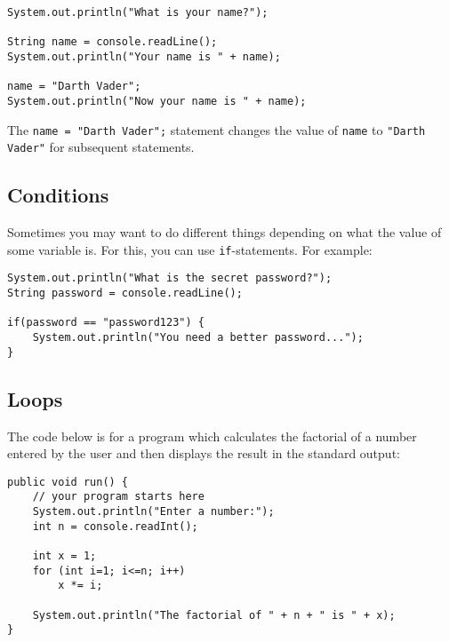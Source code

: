 \begin{verbatim}
System.out.println("What is your name?");

String name = console.readLine();
System.out.println("Your name is " + name);

name = "Darth Vader";
System.out.println("Now your name is " + name);
\end{verbatim}
The \texttt{name = "Darth Vader";} statement changes the value of \texttt{name} to \linebreak \texttt{"Darth Vader"} for subsequent statements. 
\taskLine

\subsection*{Conditions}

Sometimes you may want to do different things depending on what the value of some variable is. For this, you can use \texttt{if}-statements. For example:
\begin{verbatim}
System.out.println("What is the secret password?");
String password = console.readLine();

if(password == "password123") {
    System.out.println("You need a better password...");
}
\end{verbatim}

\taskLine 


\taskLine 

\subsection*{Loops}

The code below is for a program which calculates the factorial of a number entered by the user and then displays the result in the standard output:
\begin{verbatim}
public void run() {
    // your program starts here
    System.out.println("Enter a number:");
    int n = console.readInt();

    int x = 1;
    for (int i=1; i<=n; i++)
        x *= i; 

    System.out.println("The factorial of " + n + " is " + x);
}
\end{verbatim}

